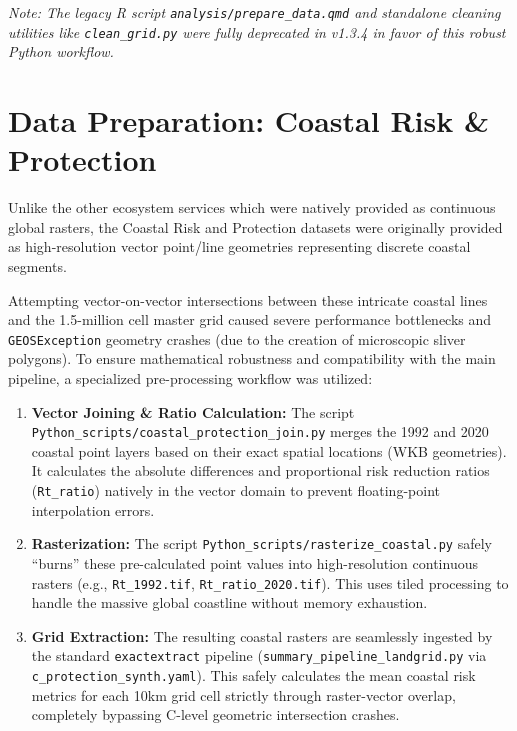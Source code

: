 \documentclass[
  letterpaper,
  DIV=11,
  numbers=noendperiod]{scrreprt}
\providecommand{\tightlist}{%
  \setlength{\itemsep}{0pt}\setlength{\parskip}{0pt}}
\begin{document}
\emph{Note: The legacy R script \texttt{analysis/prepare\_data.qmd} and
standalone cleaning utilities like \texttt{clean\_grid.py} were fully
deprecated in v1.3.4 in favor of this robust Python workflow.}

\section{Data Preparation: Coastal Risk \&
Protection}\label{data-preparation-coastal-risk-protection}

Unlike the other ecosystem services which were natively provided as
continuous global rasters, the Coastal Risk and Protection datasets were
originally provided as high-resolution vector point/line geometries
representing discrete coastal segments.

Attempting vector-on-vector intersections between these intricate
coastal lines and the 1.5-million cell master grid caused severe
performance bottlenecks and \texttt{GEOSException} geometry crashes (due
to the creation of microscopic sliver polygons). To ensure mathematical
robustness and compatibility with the main pipeline, a specialized
pre-processing workflow was utilized:

\begin{enumerate}
\def\labelenumi{\arabic{enumi}.}
\tightlist
\item
  \textbf{Vector Joining \& Ratio Calculation:} The script
  \texttt{Python\_scripts/coastal\_protection\_join.py} merges the 1992
  and 2020 coastal point layers based on their exact spatial locations
  (WKB geometries). It calculates the absolute differences and
  proportional risk reduction ratios (\texttt{Rt\_ratio}) natively in
  the vector domain to prevent floating-point interpolation errors.
\item
  \textbf{Rasterization:} The script
  \texttt{Python\_scripts/rasterize\_coastal.py} safely ``burns'' these
  pre-calculated point values into high-resolution continuous rasters
  (e.g., \texttt{Rt\_1992.tif}, \texttt{Rt\_ratio\_2020.tif}). This uses
  tiled processing to handle the massive global coastline without memory
  exhaustion.
\item
  \textbf{Grid Extraction:} The resulting coastal rasters are seamlessly
  ingested by the standard \texttt{exactextract} pipeline
  (\texttt{summary\_pipeline\_landgrid.py} via
  \texttt{c\_protection\_synth.yaml}). This safely calculates the mean
  coastal risk metrics for each 10km grid cell strictly through
  raster-vector overlap, completely bypassing C-level geometric
  intersection crashes.
\end{enumerate}
\end{document}
